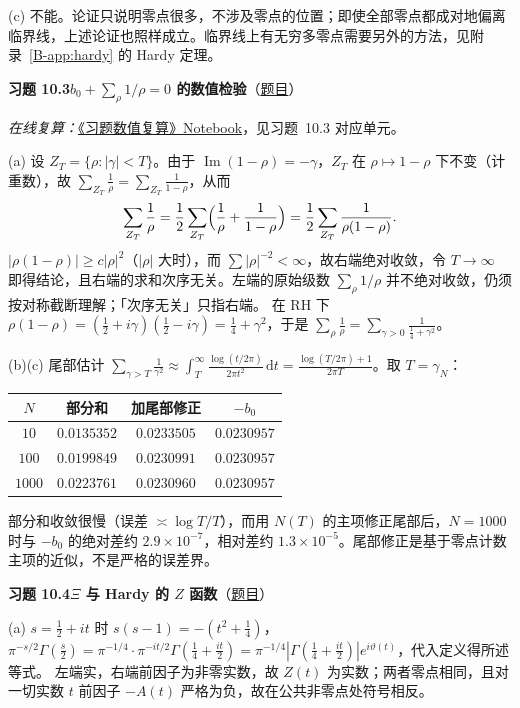 \documentclass[11pt,a4paper]{article}
\newcommand{\dd}{\,\mathrm{d}}
\renewcommand{\Im}{\operatorname{Im}}
\newcommand{\bref}[1]{\ref*{B-#1}}
\newcommand{\Sol}[2]{%
  \par\addvspace{1.2em}\noindent
  \hypertarget{s:#1}{}\textbf{习题 #1\quad #2}\hfill{\small（\hyperlink{q:#1}{题目}）}\par
  \nopagebreak\smallskip}
\begin{document}
(c) 不能。论证只说明零点很多，不涉及零点的位置；即使全部零点都成对地偏离临界线，上述论证也照样成立。临界线上有无穷多零点需要另外的方法，见附录~\bref{app:hardy} 的 Hardy 定理。

\Sol{10.3}{$b_0+\sum_\rho1/\rho=0$ 的数值检验}
\emph{在线复算：}\href{https://colab.research.google.com/github/lichengtong123/lichengtong-RH/blob/main/\%E4\%B9\%A0\%E9\%A2\%98\%E4\%B8\%8E\%E8\%A7\%A3\%E7\%AD\%94/\%E4\%B9\%A0\%E9\%A2\%98\%E6\%95\%B0\%E5\%80\%BC\%E5\%A4\%8D\%E7\%AE\%97.ipynb}{《习题数值复算》Notebook}，见习题~10.3 对应单元。

(a) 设 $Z_T=\{\rho:|\gamma|<T\}$。由于 $\Im(1-\rho)=-\gamma$，$Z_T$ 在 $\rho\mapsto1-\rho$ 下不变（计重数），故 $\sum_{Z_T}\frac1\rho=\sum_{Z_T}\frac1{1-\rho}$，从而
\[
  \sum_{Z_T}\frac1\rho=\frac12\sum_{Z_T}\Bigl(\frac1\rho+\frac1{1-\rho}\Bigr)=\frac12\sum_{Z_T}\frac1{\rho(1-\rho)} .
\]
$|\rho(1-\rho)|\ge c|\rho|^2$（$|\rho|$ 大时），而 $\sum|\rho|^{-2}<\infty$，故右端绝对收敛，令 $T\to\infty$ 即得结论，且右端的求和次序无关。左端的原始级数 $\sum_\rho1/\rho$ 并不绝对收敛，仍须按对称截断理解；「次序无关」只指右端。
在 RH 下 $\rho(1-\rho)=(\frac12+i\gamma)(\frac12-i\gamma)=\frac14+\gamma^2$，于是 $\sum_\rho\frac1\rho=\sum_{\gamma>0}\frac1{\frac14+\gamma^2}$。

(b)(c) 尾部估计 $\sum_{\gamma>T}\frac1{\gamma^2}\approx\int_T^\infty\frac{\log(t/2\pi)}{2\pi t^2}\dd t=\frac{\log(T/2\pi)+1}{2\pi T}$。取 $T=\gamma_N$：
\begin{center}
\small
\begin{tabular}{@{}cccc@{}}
\toprule
$N$ & 部分和 & 加尾部修正 & $-b_0$ \\
\midrule
$10$ & $0.0135352$ & $0.0233505$ & $0.0230957$ \\
$100$ & $0.0199849$ & $0.0230991$ & $0.0230957$ \\
$1000$ & $0.0223761$ & $0.0230960$ & $0.0230957$ \\
\bottomrule
\end{tabular}
\end{center}
部分和收敛很慢（误差 $\asymp\log T/T$），而用 $N(T)$ 的主项修正尾部后，$N=1000$ 时与 $-b_0$ 的绝对差约 $2.9\times10^{-7}$，相对差约 $1.3\times10^{-5}$。尾部修正是基于零点计数主项的近似，不是严格的误差界。

\Sol{10.4}{$\Xi$ 与 Hardy 的 $Z$ 函数}
(a) $s=\frac12+it$ 时 $s(s-1)=-(t^2+\frac14)$，$\pi^{-s/2}\Gamma(\frac s2)=\pi^{-1/4}\cdot\pi^{-it/2}\Gamma(\frac14+\frac{it}2)=\pi^{-1/4}|\Gamma(\frac14+\frac{it}2)|e^{i\vartheta(t)}$，代入定义得所述等式。
左端实，右端前因子为非零实数，故 $Z(t)$ 为实数；两者零点相同，且对一切实数 $t$ 前因子 $-A(t)$ 严格为负，故在公共非零点处符号相反。
\end{document}

